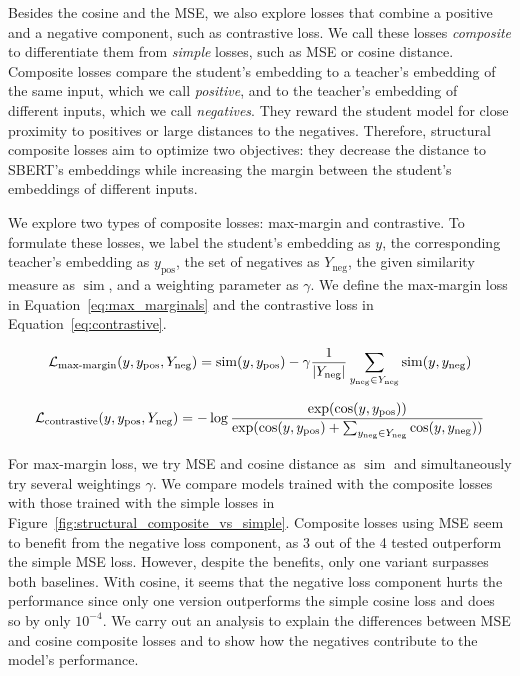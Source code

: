 Besides the cosine and the MSE, we also explore losses that combine a positive
and a negative component, such as contrastive loss. We call these losses
\emph{composite} to differentiate them from \emph{simple} losses, such as MSE
or cosine distance. Composite losses compare the student's embedding to a
teacher's embedding of the same input, which we call \emph{positive}, and to
the teacher's embedding of different inputs, which we call \emph{negatives}.
They reward the student model for close proximity to positives or large
distances to the negatives. Therefore, structural composite losses aim to
optimize two objectives: they decrease the distance to SBERT's embeddings while
increasing the margin between the student's embeddings of different inputs.

We explore two types of composite losses: max-margin and contrastive. To
formulate these losses, we label the student's embedding as $y$, the
corresponding teacher's embedding as $y_{\text{pos}}$, the set of negatives as
$Y_{\text{neg}}$, the given similarity measure as $\operatorname{sim}$, and a
weighting parameter as $\gamma$. We define the max-margin loss in
Equation~\ref{eq:max_marginals} and the contrastive loss in
Equation~\ref{eq:contrastive}.

\begin{equation}
  \mathcal{L}_{\text{max-margin}}(y, y_\text{pos}, Y_\text{neg}) =
    \operatorname{sim}(y, y_\text{pos}) -
    \gamma \frac{1}{|Y_\text{neg}|} \sum_{y_\text{neg} \in Y_\text{neg}}
      \operatorname{sim}(y, y_\text{neg})
  \label{eq:max_marginals}
\end{equation}

\begin{equation}
  \mathcal{L}_{\text{contrastive}}(y, y_\text{pos}, Y_\text{neg}) =
    -\log \frac{
      \exp(\cos(y, y_\text{pos}))
    }{
      \exp(
        \cos(y, y_\text{pos}) +
        \sum_{y_\text{neg} \in Y_\text{neg}} \cos(y, y_\text{neg})
      )
    }
  \label{eq:contrastive}
\end{equation}

For max-margin loss, we try MSE and cosine distance as $\operatorname{sim}$ and
simultaneously try several weightings $\gamma$. We compare models trained with
the composite losses with those trained with the simple losses in
Figure~\ref{fig:structural_composite_vs_simple}. Composite losses using MSE
seem to benefit from the negative loss component, as 3 out of the 4 tested
outperform the simple MSE loss. However, despite the benefits, only one variant
surpasses both baselines. With cosine, it seems that the negative loss
component hurts the performance since only one version outperforms the simple
cosine loss and does so by only $10^{-4}$. We carry out an analysis to explain
the differences between MSE and cosine composite losses and to show how the
negatives contribute to the model's performance.

